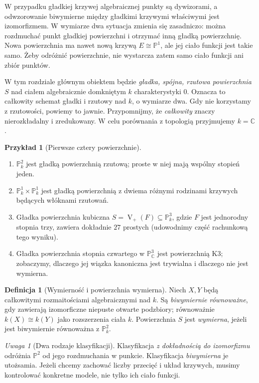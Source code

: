 \documentclass[11pt,a4paper,openany]{report}
\numberwithin{equation}{section}
\theoremstyle{plain}
\theoremstyle{definition}
\newtheorem{definicja}[twierdzenie]{Definicja}
\newtheorem{przyklad}[twierdzenie]{Przykład}
\theoremstyle{remark}
\newtheorem{uwaga}[twierdzenie]{Uwaga}
\newcommand{\C}{\mathbb C}
\newcommand{\PP}{\mathbb P}
\newcommand{\V}{\operatorname V}
\begin{document}
W przypadku gładkiej krzywej algebraicznej punkty są dywizorami,
a odwzorowanie biwymierne między gładkimi krzywymi właściwymi jest
izomorfizmem. W wymiarze dwa sytuacja zmienia się zasadniczo:
można rozdmuchać punkt gładkiej powierzchni i otrzymać inną gładką
powierzchnię. Nowa powierzchnia ma nawet nową krzywą $E\cong\PP^1$,
ale jej ciało funkcji jest takie samo. Żeby odróżnić powierzchnie,
nie wystarcza zatem samo ciało funkcji ani zbiór punktów.

W tym rozdziale głównym obiektem będzie \emph{gładka, spójna,
rzutowa powierzchnia} $S$ nad ciałem algebraicznie domkniętym
$k$ charakterystyki $0$. Oznacza to całkowity schemat gładki i
rzutowy nad $k$, o wymiarze dwa. Gdy nie korzystamy z rzutowości,
powiemy to jawnie. Przypomnijmy, że \emph{całkowity} znaczy
nierozkładalny i zredukowany. W celu porównania z topologią
przyjmujemy $k=\C$.

\begin{przyklad}[Pierwsze cztery powierzchnie]
\label{prz:ga6-examples}
\begin{enumerate}[label=(\roman*)]
\item $\PP^2_k$ jest gładką powierzchnią rzutową; proste w niej
      mają wspólny stopień jeden.
\item $\PP^1_k\times\PP^1_k$ jest gładką powierzchnią z dwiema
      różnymi rodzinami krzywych będących włóknami rzutowań.
\item Gładka powierzchnia kubiczna $S=\V_+(F)\subseteq\PP^3_k$,
      gdzie $F$ jest jednorodny stopnia trzy, zawiera dokładnie
      $27$ prostych (udowodnimy część rachunkową tego wyniku).
\item Gładka powierzchnia stopnia czwartego w $\PP^3_\C$
      jest powierzchnią K3; zobaczymy, dlaczego jej wiązka
      kanoniczna jest trywialna i dlaczego nie jest wymierna.
\end{enumerate}
\end{przyklad}

\begin{definicja}[Wymierność i powierzchnia wymierna]
Niech $X,Y$ będą całkowitymi rozmaitościami algebraicznymi nad $k$.
Są \emph{biwymiernie równoważne}, gdy zawierają izomorficzne
niepuste otwarte podzbiory; równoważnie $k(X)\cong k(Y)$ jako
rozszerzenia ciała $k$. Powierzchnia $S$ jest \emph{wymierna},
jeżeli jest biwymiernie równoważna z $\PP^2_k$.
\end{definicja}

\begin{uwaga}[Dwa rodzaje klasyfikacji]
Klasyfikacja \emph{z dokładnością do izomorfizmu} odróżnia
$\PP^2$ od jego rozdmuchania w punkcie. Klasyfikacja
\emph{biwymierna} je utożsamia. Jeżeli chcemy zachować
liczby przecięć i układ krzywych, musimy kontrolować
konkretne modele, nie tylko ich ciało funkcji.
\end{uwaga}
\end{document}
